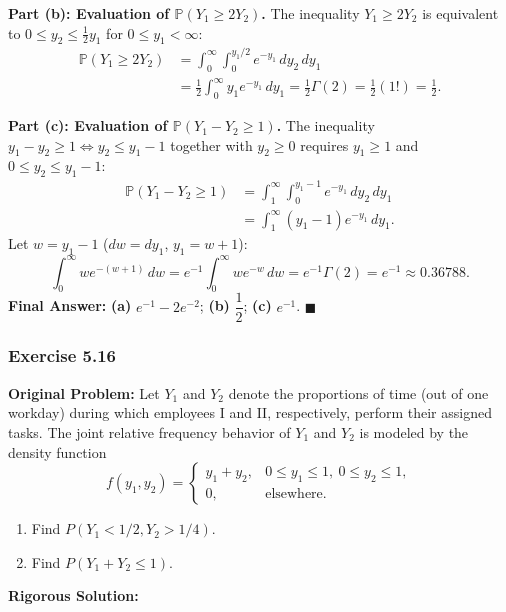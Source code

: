 \documentclass[11pt, letterpaper]{article}
\theoremstyle{definition}
\theoremstyle{remark}
\begin{document}
\textbf{Part (b): Evaluation of $\mathbb{P}(Y_1 \ge 2Y_2)$.}
The inequality $Y_1 \ge 2Y_2$ is equivalent to $0 \le y_2 \le \frac{1}{2} y_1$ for $0 \le y_1 < \infty$:
\begin{align*}
    \mathbb{P}(Y_1 \ge 2Y_2) &= \int_{0}^{\infty} \int_{0}^{y_1/2} e^{-y_1} \, dy_2 \, dy_1 \\
    &= \frac{1}{2} \int_{0}^{\infty} y_1 e^{-y_1} \, dy_1 = \frac{1}{2} \Gamma(2) = \frac{1}{2} (1!) = \frac{1}{2}.
\end{align*}

\textbf{Part (c): Evaluation of $\mathbb{P}(Y_1 - Y_2 \ge 1)$.}
The inequality $y_1 - y_2 \ge 1 \iff y_2 \le y_1 - 1$ together with $y_2 \ge 0$ requires $y_1 \ge 1$ and $0 \le y_2 \le y_1 - 1$:
\begin{align*}
    \mathbb{P}(Y_1 - Y_2 \ge 1) &= \int_{1}^{\infty} \int_{0}^{y_1 - 1} e^{-y_1} \, dy_2 \, dy_1 \\
    &= \int_{1}^{\infty} (y_1 - 1) e^{-y_1} \, dy_1.
\end{align*}
Let $w = y_1 - 1$ ($dw = dy_1$, $y_1 = w + 1$):
\[
    \int_{0}^{\infty} w e^{-(w + 1)} \, dw = e^{-1} \int_{0}^{\infty} w e^{-w} \, dw = e^{-1} \Gamma(2) = e^{-1} \approx 0.36788.
\]
\textbf{Final Answer:} \textbf{(a)} $e^{-1} - 2e^{-2}$; \quad \textbf{(b)} $\dfrac{1}{2}$; \quad \textbf{(c)} $e^{-1}$. $\blacksquare$

\bigskip

\subsubsection*{Exercise 5.16}
\textbf{Original Problem:} Let $Y_1$ and $Y_2$ denote the proportions of time (out of one workday) during which employees I and II, respectively, perform their assigned tasks. The joint relative frequency behavior of $Y_1$ and $Y_2$ is modeled by the density function
\[
    f(y_1, y_2) = \begin{cases}
        y_1 + y_2, & 0 \le y_1 \le 1,\ 0 \le y_2 \le 1, \\
        0, & \text{elsewhere.}
    \end{cases}
\]
\begin{enumerate}[label=\textbf{\alph*}]
    \item Find $P(Y_1 < 1/2, Y_2 > 1/4)$.
    \item Find $P(Y_1 + Y_2 \le 1)$.
\end{enumerate}

\textbf{Rigorous Solution:}
\end{document}
